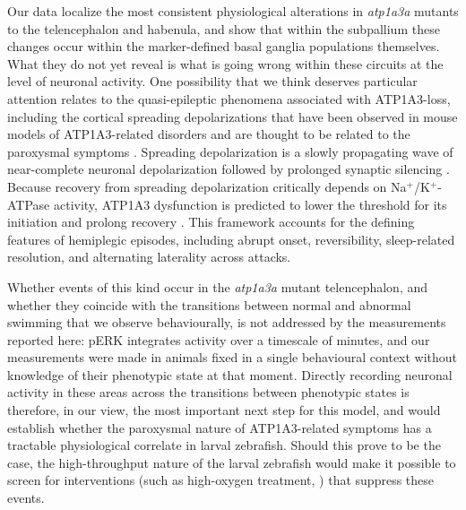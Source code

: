 \documentclass[9.5pt,lineno]{RandlettLab_elife}
\begin{document}
Our data localize the most consistent physiological alterations in \emph{atp1a3a} mutants to the telencephalon and habenula, and show that within the subpallium these changes occur within the marker-defined basal ganglia populations themselves.
What they do not yet reveal is what is going wrong within these circuits at the level of neuronal activity.
One possibility that we think deserves particular attention relates to the quasi-epileptic phenomena associated with ATP1A3-loss, including the cortical spreading depolarizations that have been observed in mouse models of ATP1A3-related disorders and are thought to be related to the paroxysmal symptoms \citep{Hunanyan2014, Balestrino1999}.
Spreading depolarization is a slowly propagating wave of near-complete neuronal depolarization followed by prolonged synaptic silencing \citep{Dreier2011}.
Because recovery from spreading depolarization critically depends on Na$^+$/K$^+$-ATPase activity, ATP1A3 dysfunction is predicted to lower the threshold for its initiation and prolong recovery \citep{Hunanyan2014, Balestrino1999}.
This framework accounts for the defining features of hemiplegic episodes, including abrupt onset, reversibility, sleep-related resolution, and alternating laterality across attacks.

Whether events of this kind occur in the \emph{atp1a3a} mutant telencephalon, and whether they coincide with the transitions between normal and abnormal swimming that we observe behaviourally, is not addressed by the measurements reported here: pERK integrates activity over a timescale of minutes, and our measurements were made in animals fixed in a single behavioural context without knowledge of their phenotypic state at that moment.
Directly recording neuronal activity in these areas across the transitions between phenotypic states is therefore, in our view, the most important next step for this model, and would establish whether the paroxysmal nature of ATP1A3-related symptoms has a tractable physiological correlate in larval zebrafish.
Should this prove to be the case, the high-throughput nature of the larval zebrafish would make it possible to screen for interventions (such as high-oxygen treatment, \citealp{Papadopoulou2023_MD}) that suppress these events.
\end{document}
